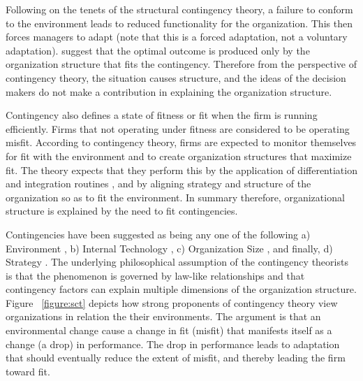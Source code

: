 \documentclass[12pt]{article}
\begin{document}
Following on the tenets of the structural contingency theory, a failure to conform to  the environment leads to reduced functionality for the organization. This then forces managers to adapt (note that this is a forced adaptation, not a voluntary adaptation).  \cite{Lawrence1967}  suggest that the optimal outcome is produced only by the organization structure that fits the contingency. Therefore from the perspective of contingency theory, the situation causes structure, and the ideas of the decision makers do not make a contribution in  explaining  the organization structure. 

Contingency also defines a state of fitness or fit when the firm is running efficiently. Firms that not operating under fitness are considered to be operating misfit. According to  contingency theory, firms are expected to monitor themselves for fit with the environment and to create organization structures that maximize fit. The theory expects that they perform this by the application of differentiation and integration routines \citep{Lawrence1967}, and by aligning strategy and structure of the organization so as to fit the environment. In summary therefore, organizational structure is explained by the need to fit contingencies.

Contingencies have been suggested as being any one of the following a) Environment \citep{Lawrence1967}, b) Internal Technology \citep{Woodward1965}, c) Organization Size \citep{Child1975,Khandwalla1973,Blau1970,Pugh1969}, and finally, d) Strategy \citep{Chandler1962}. The underlying philosophical assumption of the contingency theorists is that the phenomenon is governed by law-like relationships and that contingency factors can explain multiple dimensions of the organization structure.  Figure ~\ref{figure:sct} depicts how strong proponents of contingency theory view organizations in relation the their environments. The argument is that an environmental change cause a change in fit (misfit) that manifests itself as a change (a drop) in performance. The drop in performance leads to adaptation that should eventually reduce the extent of misfit, and thereby leading the firm toward fit.
\end{document}
